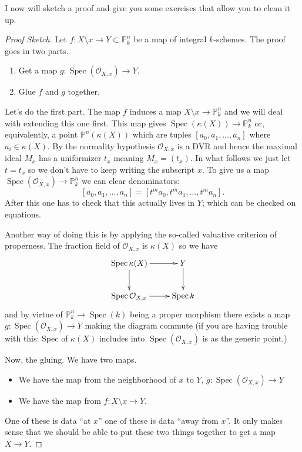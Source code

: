 \documentclass[12pt]{article}
\numberwithin{equation}{section}
\theoremstyle{definition}
\theoremstyle{remark}
\newcommand{\Ocal}{\mathcal{O}}
\newcommand{\PP}{\mathbb{P}}
\newcommand{\Spec}{\operatorname{Spec}}
\begin{document}
I now will sketch a proof and give you some exercises that allow you to clean it up. 
\begin{proof}[Proof Sketch]
	Let $f:X\setminus x \to Y\subset \PP^n_k$ be a map of integral $k$-schemes. 
	The proof goes in two parts. 
	\begin{enumerate}
		\item Get a map $g:\Spec(\Ocal_{X,x}) \to Y$.
		\item Glue $f$ and $g$ together.
	\end{enumerate}
	Let's do the first part. The map $f$ induces a map $X\setminus x \to \PP^n_k$ and we will deal with extending this one first. 
	This map gives $\Spec(\kappa(X)) \to \PP^n_k$ or, equivalently, a point $\PP^n(\kappa(X))$ which are tuples $[a_0,a_1,\ldots,a_n]$ where $a_i\in \kappa(X)$.
	By the normality hypothesis $\Ocal_{X,x}$ is a DVR and hence the maximal ideal $M_x$ has a uniformizer $t_x$ meaning $M_x = (t_x)$.
	In what follows we just let $t=t_x$ so we don't have to keep writing the subscript $x$.
	To give us a map $\Spec(\Ocal_{X,x}) \to \PP^n_k$ we can clear denominators:
	$$[a_0,a_1,\ldots,a_n] = [t^ma_0,t^ma_1,\ldots,t^m a_n].$$
	After this one has to check that this actually lives in $Y$; which can be checked on equations.
	
	Another way of doing this is by applying the so-called valuative criterion of properness. 
	The fraction field of $\Ocal_{X,x}$ is $\kappa(X)$ so we have 
	$$\xymatrix{
		\Spec \kappa(X) \ar[r] \ar[d] & Y \ar[d] \\
		\Spec \Ocal_{X,x} \ar[r] & \Spec k 
	}$$
	and by virtue of $\PP^n_k\to \Spec(k)$ being a proper morphism there exists a map $g:\Spec(\Ocal_{X,x}) \to Y$ making the diagram commute (if you are having trouble with this: Spec of $\kappa(X)$ includes into $\Spec(\Ocal_{X,x})$ is as the generic point.)
	
	Now, the gluing.
	We have two maps. 
	\begin{itemize}
		\item We have the map from the neighborhood of $x$ to $Y$, $g: \Spec(\Ocal_{X,x}) \to Y$ 
		\item We have the map from $f: X\setminus x \to Y$.
	\end{itemize}
	One of these is data ``at $x$'' one of these is data ``away from $x$''.
	It only makes sense that we should be able to put these two things together to get a map $X\to Y$.
	

\end{proof}
\end{document}
